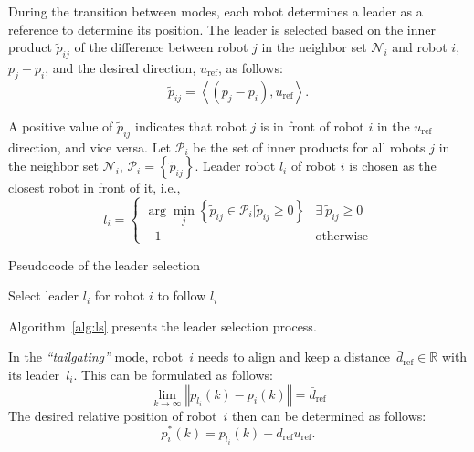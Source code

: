 During the transition between modes, each robot determines a leader as a reference to determine its position. The leader is selected based on the inner product $\tilde{p}_{ij}$ of the difference between robot $j$ in the neighbor set $\mathcal{N}_i$ and robot $i$, $p_j-p_i$, and the desired direction, $u_\text{ref}$, as follows:
\begin{equation}
    \tilde{p}_{ij} = \left\langle (p_j-p_i),u_\text{ref}\right\rangle.
    \label{eqn:tildep}
\end{equation}

A positive value of $\tilde{p}_{ij}$ indicates that robot $j$ is in front of robot $i$ in the $u_\text{ref}$ direction, and vice versa. Let $\mathcal{P}_i$ be the set of inner products for all robots $j$ in the neighbor set $\mathcal{N}_i$, $\mathcal{P}_i=\left\{\tilde{p}_{ij}\right\}$. Leader robot ${l_i}$ of robot $i$ is chosen as the closest robot in front of it, i.e.,
\begin{equation}
     l_i=\begin{cases}
    \arg\min_{j}\left\{\tilde{p}_{ij}\in\mathcal{P}_i\vert\tilde{p}_{ij}\geq0\right\} & \exists~\tilde{p}_{ij}\geq0\\ 
    -1 & \text{otherwise}
     \end{cases}
    \label{eqn:li}
\end{equation}

\begin{algorithm}
\caption{Pseudocode of the leader selection}
\label{alg:ls}
Select leader $l_i$ for robot $i$ to follow
\Return $l_i$\;
\end{algorithm}

Algorithm~\ref{alg:ls} presents the leader selection process. 

In the \textit{``tailgating''} mode, robot~$i$ needs to align and keep a distance~$\bar{d}_\text{ref}\in\mathbb{R}$ with its leader~$l_i$. This can be formulated as follows:
\begin{equation}
    \lim_{k\to\infty}{\left\Vert p_{l_i}(k)-p_i(k)\right\Vert}=\bar{d}_\text{ref}
    \label{eqn:tailcon}
\end{equation}
The desired relative position of robot~$i$ then can be determined as follows:
\begin{equation}
    p_i^*(k)= p_{l_i}(k)-\bar{d}_\text{ref}u_\text{ref}.
    \label{eqn:tailgating}
\end{equation}

